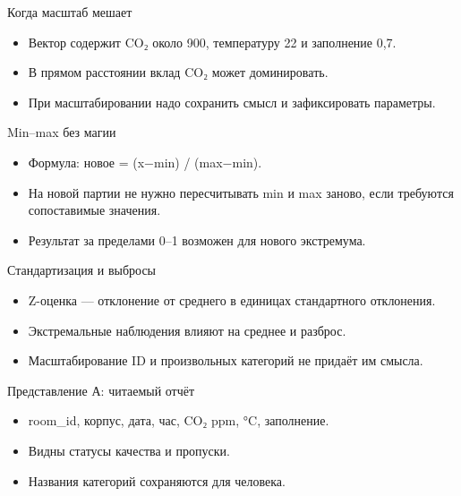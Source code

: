 \documentclass[aspectratio=169,10pt]{beamer}
\begin{document}
\begin{frame}[t]{Когда масштаб мешает}
\begin{itemize}
\item Вектор содержит CO₂ около 900, температуру 22 и заполнение 0,7.
\vspace{4pt}
\item В прямом расстоянии вклад CO₂ может доминировать.
\vspace{4pt}
\item При масштабировании надо сохранить смысл и зафиксировать параметры.
\vspace{4pt}
\end{itemize}
\end{frame}
\begin{frame}[t]{Min–max без магии}
\begin{itemize}
\item Формула: новое = (x−min) / (max−min).
\vspace{4pt}
\item На новой партии не нужно пересчитывать min и max заново, если требуются сопоставимые значения.
\vspace{4pt}
\item Результат за пределами 0–1 возможен для нового экстремума.
\vspace{4pt}
\end{itemize}
\end{frame}
\begin{frame}[t]{Стандартизация и выбросы}
\begin{itemize}
\item Z-оценка — отклонение от среднего в единицах стандартного отклонения.
\vspace{4pt}
\item Экстремальные наблюдения влияют на среднее и разброс.
\vspace{4pt}
\item Масштабирование ID и произвольных категорий не придаёт им смысла.
\vspace{4pt}
\end{itemize}
\end{frame}
\begin{frame}[t]{Представление А: читаемый отчёт}
\begin{itemize}
\item room\_id, корпус, дата, час, CO₂ ppm, °C, заполнение.
\vspace{4pt}
\item Видны статусы качества и пропуски.
\vspace{4pt}
\item Названия категорий сохраняются для человека.
\vspace{4pt}
\end{itemize}
\end{frame}
\end{document}
